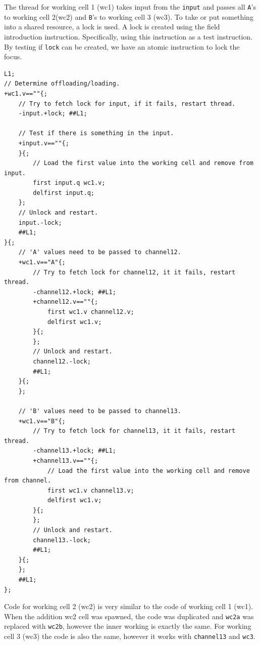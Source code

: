 \documentclass[a4paper,12px]{article}
\begin{document}
The thread for working cell 1 (wc1) takes input from the \verb|input| and passes all \verb|A|'s  to working cell 2(wc2) and \verb|B|'s to working cell 3 (wc3). To take or put something into a shared resource, a lock is used. A lock is created using the field introduction instruction. Specifically, using this instruction as a test instruction. By testing if \verb|lock| can be created, we have an atomic instruction to lock the focus.

\begin{verbatim}
L1;
// Determine offloading/loading.
+wc1.v==""{;
    // Try to fetch lock for input, if it fails, restart thread.
    -input.+lock; ##L1;

    // Test if there is something in the input.
    +input.v==""{;
    }{;
        // Load the first value into the working cell and remove from input.
        first input.q wc1.v;
        delfirst input.q;
    };
    // Unlock and restart.
    input.-lock;
    ##L1;
}{;
    // 'A' values need to be passed to channel12.
    +wc1.v=="A"{;
        // Try to fetch lock for channel12, it it fails, restart thread.
        -channel12.+lock; ##L1;
        +channel12.v==""{;
            first wc1.v channel12.v;
            delfirst wc1.v;
        }{;
        };
        // Unlock and restart.
        channel12.-lock;
        ##L1;
    }{;
    };

    // 'B' values need to be passed to channel13.
    +wc1.v=="B"{;
        // Try to fetch lock for channel13, it it fails, restart thread.
        -channel13.+lock; ##L1;
        +channel13.v==""{;
            // Load the first value into the working cell and remove from channel.
            first wc1.v channel13.v;
            delfirst wc1.v;
        }{;
        };
        // Unlock and restart.
        channel13.-lock;
        ##L1;
    }{;
    };
    ##L1;
};
\end{verbatim}

Code for working cell 2 (wc2) is very similar to the code of working cell 1
(wc1). When the addition wc2 cell was spawned, the code was duplicated and
\verb|wc2a| was replaced with \verb|wc2b|, however the inner working is exactly
the same. For working cell 3 (wc3) the code is also the same, however it works
with \verb|channel13| and \verb|wc3|.
\end{document}
